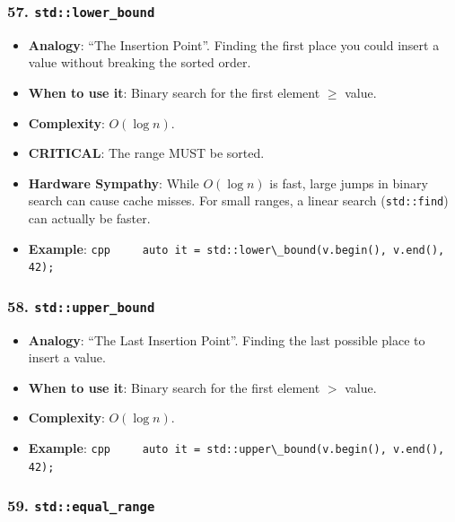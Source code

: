 \hypertarget{stdlower_bound}{%
\subsubsection{\texorpdfstring{57.
\texttt{std::lower\_bound}}{57. std::lower\_bound}}\label{stdlower_bound}}

\begin{itemize}
\tightlist
\item
  \textbf{Analogy}: ``The Insertion Point''. Finding the first place you
  could insert a value without breaking the sorted order.
\item
  \textbf{When to use it}: Binary search for the first element \(\ge\)
  value.
\item
  \textbf{Complexity}: \(O(\log n)\).
\item
  \textbf{CRITICAL}: The range MUST be sorted.
\item
  \textbf{Hardware Sympathy}: While \(O(\log n)\) is fast, large jumps
  in binary search can cause cache misses. For small ranges, a linear
  search (\passthrough{\lstinline!std::find!}) can actually be faster.
\item
  \textbf{Example}:
  \passthrough{\lstinline!cpp     auto it = std::lower\_bound(v.begin(), v.end(), 42);!}
\end{itemize}

\hypertarget{stdupper_bound}{%
\subsubsection{\texorpdfstring{58.
\texttt{std::upper\_bound}}{58. std::upper\_bound}}\label{stdupper_bound}}

\begin{itemize}
\tightlist
\item
  \textbf{Analogy}: ``The Last Insertion Point''. Finding the last
  possible place to insert a value.
\item
  \textbf{When to use it}: Binary search for the first element \(>\)
  value.
\item
  \textbf{Complexity}: \(O(\log n)\).
\item
  \textbf{Example}:
  \passthrough{\lstinline!cpp     auto it = std::upper\_bound(v.begin(), v.end(), 42);!}
\end{itemize}

\hypertarget{stdequal_range}{%
\subsubsection{\texorpdfstring{59.
\texttt{std::equal\_range}}{59. std::equal\_range}}\label{stdequal_range}}

